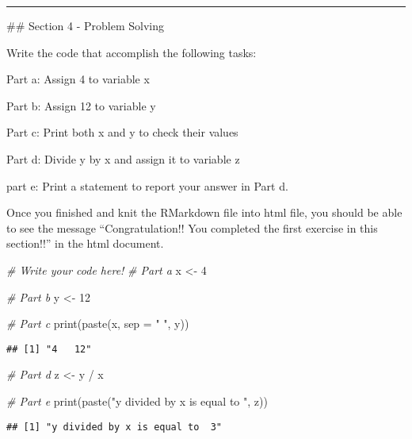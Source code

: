 \documentclass[
]{article}
\newenvironment{Shaded}{\begin{snugshade}}{\end{snugshade}}
\newcommand{\AttributeTok}[1]{\textcolor[rgb]{0.77,0.63,0.00}{#1}}
\newcommand{\CommentTok}[1]{\textcolor[rgb]{0.56,0.35,0.01}{\textit{#1}}}
\newcommand{\DecValTok}[1]{\textcolor[rgb]{0.00,0.00,0.81}{#1}}
\newcommand{\FunctionTok}[1]{\textcolor[rgb]{0.00,0.00,0.00}{#1}}
\newcommand{\NormalTok}[1]{#1}
\newcommand{\OtherTok}[1]{\textcolor[rgb]{0.56,0.35,0.01}{#1}}
\newcommand{\SpecialCharTok}[1]{\textcolor[rgb]{0.00,0.00,0.00}{#1}}
\newcommand{\StringTok}[1]{\textcolor[rgb]{0.31,0.60,0.02}{#1}}
\begin{document}
\begin{center}\rule{0.5\linewidth}{0.5pt}\end{center}

\#\# Section 4 - Problem Solving

Write the code that accomplish the following tasks:

Part a: Assign 4 to variable x

Part b: Assign 12 to variable y

Part c: Print both x and y to check their values

Part d: Divide y by x and assign it to variable z

part e: Print a statement to report your answer in Part d.

Once you finished and knit the RMarkdown file into html file, you should
be able to see the message ``Congratulation!! You completed the first
exercise in this section!!'' in the html document.

\begin{Shaded}
\begin{Highlighting}[]
\CommentTok{\# Write your code here!}
\CommentTok{\# Part a}
\NormalTok{x }\OtherTok{\textless{}{-}} \DecValTok{4}

\CommentTok{\# Part b}
\NormalTok{y }\OtherTok{\textless{}{-}} \DecValTok{12}

\CommentTok{\# Part c}
\FunctionTok{print}\NormalTok{(}\FunctionTok{paste}\NormalTok{(x, }\AttributeTok{sep =} \StringTok{"   "}\NormalTok{, y))}
\end{Highlighting}
\end{Shaded}

\begin{verbatim}
## [1] "4   12"
\end{verbatim}

\begin{Shaded}
\begin{Highlighting}[]
\CommentTok{\# Part d}
\NormalTok{z }\OtherTok{\textless{}{-}}\NormalTok{ y }\SpecialCharTok{/}\NormalTok{ x}

\CommentTok{\# Part e}
\FunctionTok{print}\NormalTok{(}\FunctionTok{paste}\NormalTok{(}\StringTok{"y divided by x is equal to "}\NormalTok{, z))}
\end{Highlighting}
\end{Shaded}

\begin{verbatim}
## [1] "y divided by x is equal to  3"
\end{verbatim}
\end{document}
